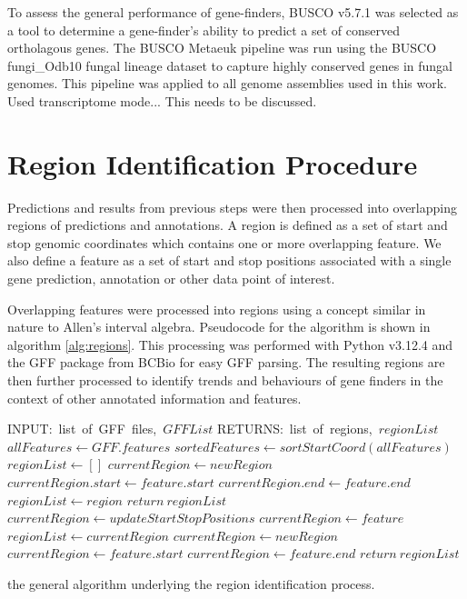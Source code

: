 To assess the general performance of gene-finders, BUSCO
v5.7.1\cite{10.1093/bioinformatics/btv351} was selected as a tool to
determine a gene-finder's ability to predict a set of conserved
ortholagous genes. The BUSCO Metaeuk pipeline was run using the BUSCO
fungi\_Odb10 fungal lineage dataset to capture highly conserved genes
in fungal genomes. This pipeline was applied to all genome assemblies
used in this work. Used transcriptome mode... This needs to be
discussed.

\section{Region Identification Procedure}
\label{section:region-met}

Predictions and results from previous steps were then processed into
overlapping regions of predictions and annotations. A region is
defined as a set of start and stop genomic coordinates which contains
one or more overlapping feature. We also define a feature as a set of
start and stop positions associated with a single gene prediction,
annotation or other data point of interest.

Overlapping features were processed into regions using a concept
similar in nature to Allen's interval
algebra\cite{DECHTER2003333}. Pseudocode for the algorithm is shown in
algorithm \ref{alg:regions}. This processing was performed with Python
v3.12.4\cite{Foundation} and the GFF package from BCBio\cite{Chapman}
for easy GFF parsing.  The resulting regions are then further
processed to identify trends and behaviours of gene finders in the
context of other annotated information and features.

\begin{algorithm}
  \begin{algorithmic}
    \State INPUT:\ list\ of\ GFF\ files,\ $GFFList$
    \State RETURNS:\ list\ of\ regions,\ $regionList$
    \State $allFeatures \gets GFF.features$
    \EndFor
    \State $sortedFeatures \gets sortStartCoord(allFeatures)$
    \State $regionList \gets []$
        \State $currentRegion \gets newRegion$
        \State $currentRegion.start \gets feature.start$
        \State $currentRegion.end \gets feature.end$
        \State $regionList \gets region$
        \State $return\ regionList$
        \State $currentRegion \gets updateStartStopPositions$
        \State $currentRegion \gets feature$
      \Else
        \State $regionList \gets currentRegion$
        \State $currentRegion \gets newRegion$
        \State $currentRegion \gets feature.start$
        \State $currentRegion \gets feature.end$
      \EndIf
    \EndFor
    \State $return\ regionList$
  \end{algorithmic}
  \caption{the general algorithm underlying the region identification
    process.}
  \label{alg:regions}
\end{algorithm}

